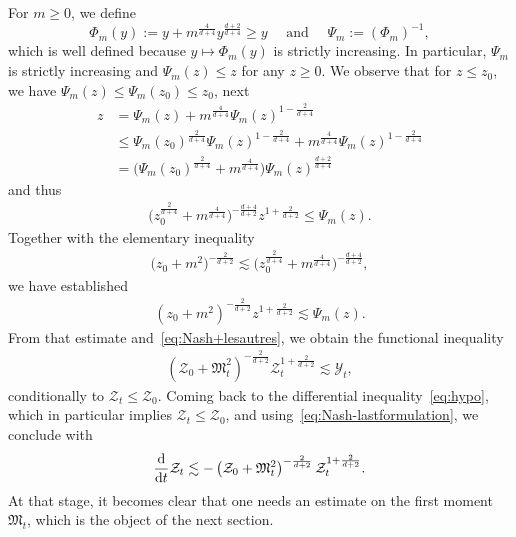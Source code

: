 \documentclass[11pt]{amsart}
\theoremstyle{definition}
\theoremstyle{remark}
\numberwithin{equation}{section}
\def\YY{{\mathcal Y}}
\def\ZZ{{\mathcal Z}}
\newcommand{\dt}{\frac{{\rm d}}{{\rm d}t}}
\begin{document}
\smallskip
For $m \ge 0$, we define
\begin{equation*}
  \Phi_{m} (y) := y +  m^{ \frac{4}{d+4}}  y ^{\frac{d+2}{d+4}} \ge y \quad \text{ and } \quad \Psi_m := \left( \Phi_m \right)^{-1},
\end{equation*}
which is well defined because $y \mapsto \Phi_{m} (y)$ is strictly increasing. In particular, $\Psi_m$ is strictly increasing and $\Psi_m(z) \le z$ for any $z \ge 0$.
We observe that for $z \le z_0$, we have $\Psi_m(z) \le \Psi_m(z_0) \le z_0$, next
\begin{align*}
  z &= \Psi_m (z) +  m^{\frac{4}{d+4}}  \Psi_m(z) ^{1 - {\frac{2}{d+4}}} \\
    &\le  \Psi_m (z_0)^{\frac{2}{d+4}}   \Psi_m(z)^{1 - {\frac{2}{d+4}}}   +  m^{\frac{4}{d+4}}   \Psi_m(z)^{1 - {\frac{2}{d+4}}} \\
    &= \big(\Psi_m (z_0)^{\frac{2}{d+4}} + m^{\frac{4}{d+4}}\big) \Psi_m(z)^{ \frac{d+2}{d+4}}
\end{align*}
and thus
\begin{align*}
  \big(z_0^{\frac{2}{d+4}} + m^{\frac{4}{d+4}} \big)^{-\frac{d+4}{d+2}} z^{1 +\frac{2}{d+2}} \le \Psi_m(z).
\end{align*}
Together with the elementary inequality
\begin{align*}
  \big(z_0 + m^{2} \big)^{-\frac{2}{d+2}} \lesssim 
  \big(z_0^{\frac{2}{d+4}} + m^{\frac{4}{d+4}} \big)^{-\frac{d+4}{d+2}},
\end{align*}
we have established
\begin{align*}
   (z_0     +  m^{2}  )^{-\frac{2}{d+2}}  z^{1 +\frac{2}{d+2}}  \lesssim   \Psi_m(z) .
\end{align*}
From that estimate and~\eqref{eq:Nash+lesautres}, we obtain the functional inequality
\begin{align}\label{eq:Nash-lastformulation}
   \left(\ZZ_0 + \mathfrak M_t ^{2} \right)^{-\frac{2}{d+2}}  \ZZ_t^{1 +\frac{2}{d+2}} \lesssim \YY_t, 
\end{align}
conditionally to $\ZZ_t \le \ZZ_0$.
Coming back to the differential inequality~\eqref{eq:hypo}, which in particular implies $\ZZ_t \le \ZZ_0$, 
and using~\eqref{eq:Nash-lastformulation}, we conclude with
\begin{equation}
  \label{eq:lastdiffineq}
  \dt \ZZ_t \lesssim - \left(\ZZ_0 + \mathfrak M^{2}_t \right)^{-\frac{2}{d+2}}  \ZZ_t ^{1 +\frac{2}{d+2}}.
\end{equation}
At that stage, it becomes clear that one needs an estimate on the first moment $\mathfrak M_t$, which is the object of the next section.
\end{document}
